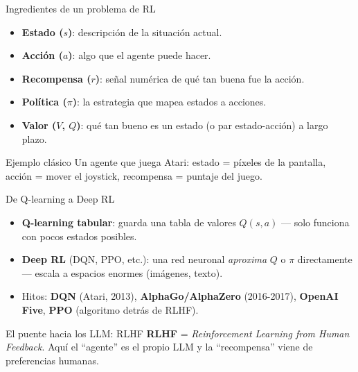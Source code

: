 \begin{frame}{Ingredientes de un problema de RL}
  \small
  \begin{itemize}
    \item \textbf{Estado ($s$)}: descripción de la situación actual.
    \item \textbf{Acción ($a$)}: algo que el agente puede hacer.
    \item \textbf{Recompensa ($r$)}: señal numérica de qué tan buena fue la acción.
    \item \textbf{Política ($\pi$)}: la estrategia que mapea estados a acciones.
    \item \textbf{Valor ($V$, $Q$)}: qué tan bueno es un estado (o par estado-acción)
      a largo plazo.
  \end{itemize}
  \vfill
  \begin{exampleblock}{Ejemplo clásico}
    Un agente que juega Atari: estado = píxeles de la pantalla, acción =
    mover el joystick, recompensa = puntaje del juego.
  \end{exampleblock}
\end{frame}

\begin{frame}{De Q-learning a Deep RL}
  \begin{itemize}
    \item \textbf{Q-learning tabular}: guarda una tabla de valores
      $Q(s,a)$ — solo funciona con pocos estados posibles.
    \item \textbf{Deep RL} (DQN, PPO, etc.): una red neuronal
      \emph{aproxima} $Q$ o $\pi$ directamente — escala a espacios enormes
      (imágenes, texto).
    \item Hitos: \textbf{DQN} (Atari, 2013), \textbf{AlphaGo/AlphaZero}
      (2016-2017), \textbf{OpenAI Five}, \textbf{PPO} (algoritmo detrás de RLHF).
  \end{itemize}
\end{frame}

\begin{frame}{El puente hacia los LLM: RLHF}
  \centering
  \vfill
  \small
  \textbf{RLHF} = \emph{Reinforcement Learning from Human Feedback}. Aquí el
  ``agente'' es el propio LLM y la ``recompensa'' viene de preferencias humanas.
\end{frame}
